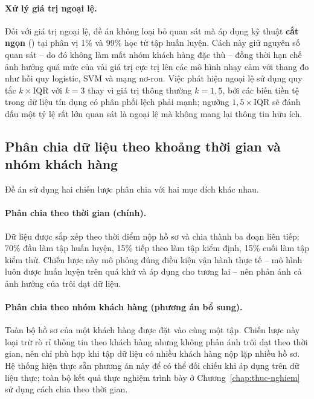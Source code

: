 \paragraph{Xử lý giá trị ngoại lệ.} Đối với giá trị ngoại lệ, đề án không loại bỏ
quan sát mà áp dụng kỹ thuật \textbf{cắt ngọn} () tại phân vị 1\%
và 99\% học từ tập huấn luyện. Cách này giữ nguyên số quan sát -- do đó không làm
mất nhóm khách hàng đặc thù -- đồng thời hạn chế ảnh hưởng quá mức của vài giá
trị cực trị lên các mô hình nhạy cảm với thang đo như hồi quy logistic, SVM và
mạng nơ-ron. Việc phát hiện ngoại lệ sử dụng quy tắc $k \times \text{IQR}$ với
$k = 3$ thay vì giá trị thông thường $k = 1{,}5$, bởi các biến tiền tệ trong dữ
liệu tín dụng có phân phối lệch phải mạnh; ngưỡng $1{,}5 \times \text{IQR}$ sẽ
đánh dấu một tỷ lệ rất lớn quan sát là ngoại lệ mà không mang lại thông tin hữu
ích.

\subsection{Phân chia dữ liệu theo khoảng thời gian và nhóm khách hàng}
\label{subsec:phan-chia-du-lieu}

Đề án sử dụng hai chiến lược phân chia với hai mục đích khác nhau.

\paragraph{Phân chia theo thời gian (chính).} Dữ liệu được sắp xếp theo thời điểm
nộp hồ sơ và chia thành ba đoạn liên tiếp: 70\% đầu làm tập huấn luyện, 15\% tiếp
theo làm tập kiểm định, 15\% cuối làm tập kiểm thử. Chiến lược này mô phỏng đúng
điều kiện vận hành thực tế -- mô hình luôn được huấn luyện trên quá khứ và áp
dụng cho tương lai -- nên phản ánh cả ảnh hưởng của trôi dạt dữ liệu.

\paragraph{Phân chia theo nhóm khách hàng (phương án bổ sung).} Toàn bộ hồ sơ của
một khách hàng được đặt vào cùng một tập. Chiến lược này loại trừ rò rỉ thông tin
theo khách hàng nhưng không phản ánh trôi dạt theo thời gian, nên chỉ phù hợp khi
tập dữ liệu có nhiều khách hàng nộp lặp nhiều hồ sơ. Hệ thống hiện thực sẵn
phương án này để có thể đối chiếu khi áp dụng trên dữ liệu thực; toàn bộ kết quả
thực nghiệm trình bày ở Chương~\ref{chap:thuc-nghiem} sử dụng cách chia theo thời
gian.

